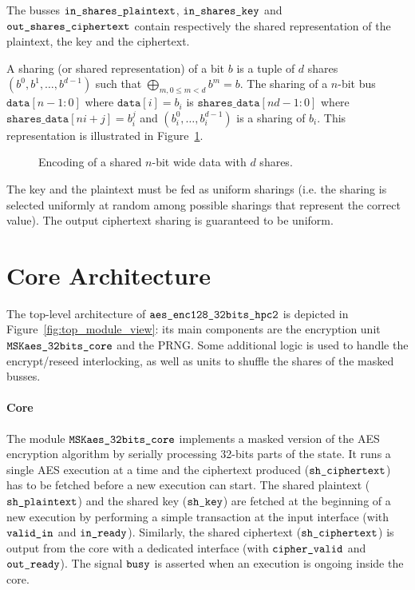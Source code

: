 \documentclass{scrartcl}
\begin{document}
The busses $\texttt{in\_shares\_plaintext}$, $\texttt{in\_shares\_key}$ and
$\texttt{out\_shares\_ciphertext}$ contain respectively the shared representation of the
plaintext, the key and the ciphertext.

A sharing (or shared representation) of a bit $b$ is a tuple of $d$ shares
$\left(b^0, b^1, \dots, b^{d-1} \right)$ such that $\bigoplus_{m,0\leq m<d} b^m = b$.
The sharing of a $n$-bit bus
$\texttt{data}\left[ n-1:0\right]$ where $\texttt{data}[i]=b_i$
is
$\texttt{shares\_data}\left[ nd-1:0 \right]$ where
$\texttt{shares\_data}\left[ ni+j\right] = b_i^j$ and
$\left(b_i^0, \dots, b_i^{d-1}\right)$ is a sharing of $b_i$.
This representation is illustrated in Figure~\ref{fig:encoding}.

\begin{figure}
    \centering
    \resizebox{\textwidth}{!}{
        \begin{tikzpicture}
            
        \end{tikzpicture}
    }
    \caption{Encoding of a shared $n$-bit wide data with $d$ shares.}
    \label{fig:encoding}
\end{figure}

The key and the plaintext must be fed as uniform sharings (i.e. the sharing is
selected uniformly at random among possible sharings that represent the correct
value). The output ciphertext sharing is guaranteed to be uniform.

\section{Core Architecture}
\label{section:architecture}

The top-level architecture of $\texttt{aes\_enc128\_32bits\_hpc2}$ is depicted in Figure~\ref{fig:top_module_view}:
its main components are the encryption unit $\texttt{MSKaes\_32bits\_core}$ and the PRNG. Some additional logic
is used to handle the encrypt/reseed interlocking, as well as units to shuffle
the shares of the masked busses.

\paragraph{Core}
The module $\texttt{MSKaes\_32bits\_core}$ implements a masked version of the AES encryption
algorithm by serially processing 32-bits parts of the state. It runs a single
AES execution at a time and the ciphertext produced ($\texttt{sh\_ciphertext}$) has
to be fetched before a new execution can start.
The shared plaintext ($\texttt{sh\_plaintext}$) and the shared
key ($\texttt{sh\_key}$) are fetched at the beginning of a new execution by
performing a simple transaction at the input interface (with
$\texttt{valid\_in}$ and $\texttt{in\_ready}$).
Similarly, the shared ciphertext ($\texttt{sh\_ciphertext}$) is output from the core
with a dedicated interface (with $\texttt{cipher\_valid}$ and
$\texttt{out\_ready}$). The signal $\texttt{busy}$ is asserted when 
an execution is ongoing inside the core.
\end{document}
